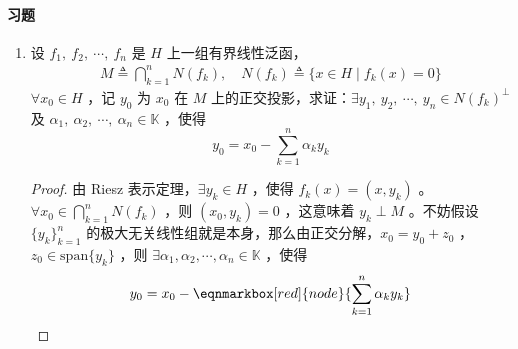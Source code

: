 \paragraph{习题}
\begin{enumerate}[leftmargin=2cm, label=\arabic*]
    \item 设 $f_1,\ f_2,\ \cdots,\ f_n$ 是 $H$ 上一组有界线性泛函，
\begin{align*}
    M \triangleq \bigcap\limits_{k=1}^n N(f_k), \quad N(f_k) \triangleq \{x\in H\mid f_k(x) = 0\}
\end{align*}
$\forall x_0\in H$ ，记 $y_0$ 为 $x_0$ 在 $M$ 上的正交投影，求证：$\exists y_1,\ y_2,\ \cdots,\ y_n\in N(f_k)^{\perp}$ 及 $\alpha_1,\ \alpha_2,\ \cdots,\ \alpha_n\in\mathbb{K}$ ，使得
\begin{equation*}
    y_0 = x_0 - \sum\limits_{k=1}^n \alpha_ky_k
\end{equation*}
\begin{proof}
由 Riesz 表示定理，$\exists y_k\in H$ ，使得 $f_k(x) = (x,y_k)$ 。$\forall x_0\in \bigcap\limits_{k=1}^n N(f_k)$ ，则 $(x_0, y_k) = 0$ ，这意味着 $y_k\perp M$ 。不妨假设 $\{y_k\}_{k=1}^{n}$ 的极大无关线性组就是本身，那么由正交分解，$x_0 = y_0 + z_0$ ，$z_0\in \text{span}\{y_k\}$ ，则 $\exists \alpha_1, \alpha_2,\cdots, \alpha_n\in\mathbb{K}$ ，使得
\begin{equation*}
    y_0 = x_0 - \eqnmarkbox[red]{node}{\sum\limits_{k=1}^n \alpha_k y_k}
\end{equation*}



\end{proof}
\end{enumerate}
